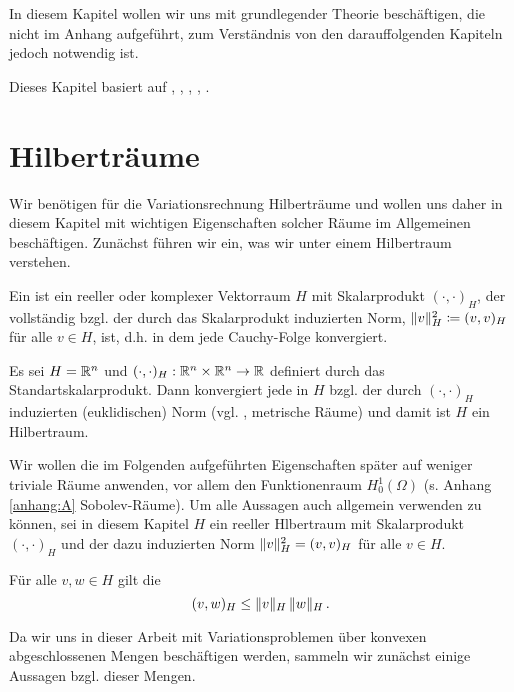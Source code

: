\label{kap:2}

In diesem Kapitel wollen wir uns mit grundlegender Theorie beschäftigen, die nicht im Anhang aufgeführt, zum Verständnis von den darauffolgenden Kapiteln jedoch notwendig ist.

Dieses Kapitel basiert auf \cite{BraeFEM}, \cite{StarkePDE}, \cite{EPS}, \cite{Walker}, \cite{AltKonti}.


\section{Hilberträume}
\label{kap:2.1}


Wir benötigen für die Variationsrechnung Hilberträume und wollen uns daher in diesem Kapitel mit wichtigen Eigenschaften solcher Räume im Allgemeinen beschäftigen. Zunächst führen wir ein, was wir unter einem Hilbertraum verstehen.


\begin{defi}\label{def:2.1}
Ein \textit{} ist ein reeller oder komplexer Vektorraum $H$ mit Skalarprodukt $(\cdot, \cdot)_H$, der vollständig bzgl. der durch das Skalarprodukt induzierten Norm, $\lVert v\rVert_H^2 \coloneqq{(v,v)_H}$ für alle $v \in H$, ist, d.h. in dem jede Cauchy-Folge konvergiert.
\end{defi}


\begin{bsp*}
Es sei $H = \mathbb{R}^n$ und $(\cdot,\cdot)_H : \mathbb{R}^n\times \mathbb{R}^n \rightarrow \mathbb{R}$ definiert durch das Standartskalarprodukt. Dann konvergiert jede  in $H$ bzgl. der durch $(\cdot,\cdot)_H$ induzierten (euklidischen) Norm (vgl. \cite{Ana2}, metrische Räume) und damit ist $H$ ein Hilbertraum.
\end{bsp*}


Wir wollen die im Folgenden aufgeführten Eigenschaften später auf weniger triviale Räume anwenden, vor allem den Funktionenraum $H^1_0(\Omega)$ (s. Anhang \ref{anhang:A} Sobolev-Räume). Um alle Aussagen auch allgemein verwenden zu können, sei in diesem Kapitel $H$ ein reeller Hlbertraum mit Skalarprodukt $(\cdot,\cdot)_H$ und der dazu induzierten Norm $\lVert v\rVert_H^2 = (v,v)_H$ für alle $v \in H$.


\begin{bem*}
Für alle $v,w \in H$ gilt die 
\[
	(v,w)_H \le \lVert v\rVert_H \, \lVert w\rVert_H \, .
\]
\end{bem*}


Da wir uns in dieser Arbeit mit Variationsproblemen über konvexen abgeschlossenen Mengen beschäftigen werden, sammeln wir zunächst einige Aussagen bzgl. dieser Mengen.


